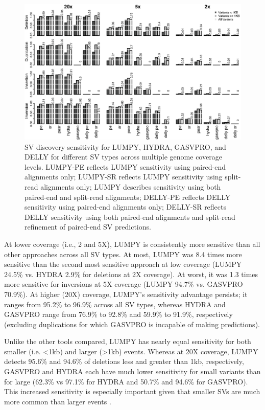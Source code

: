 \documentclass[11pt]{article}
\begin{document}
\begin{figure}
\includegraphics[width=6.5in]{R/ss_sl_s-un_hy_gv_dl-r10x.eps}
\caption{SV discovery sensitivity for LUMPY, HYDRA, GASVPRO, and DELLY for
different SV types across multiple genome coverage levels. LUMPY-PE reflects
LUMPY sensitivity using paired-end alignments only; LUMPY-SR reflects
LUMPY sensitivity using split-read alignments only; LUMPY describes sensitivity
using both paired-end and split-read alignments; DELLY-PE reflects
DELLY sensitivity using paired-end alignments only; DELLY-SR reflects
DELLY sensitivity using both paired-end alignments and split-read refinement
of paired-end SV predictions.}
\label{sensitivity:fig}
\end{figure}

At lower coverage (i.e., 2 and 5X), LUMPY is consistently more sensitive 
than all other approaches across all SV types. At most, LUMPY was 
8.4 times more sensitive than the second most sensitive approach at low 
coverage (LUMPY 24.5\% vs. HYDRA 2.9\% for deletions at 2X coverage). At worst, 
it was 1.3 times more sensitive for inversions at 5X coverage (LUMPY 94.7\% vs. 
GASVPRO 70.9\%). At higher (20X) coverage, 
LUMPY's sensitivity advantage persists; it ranges from 95.2\% to 96.9\% 
across all SV types, whereas HYDRA and GASVPRO range from 76.9\% to 92.8\% and
59.9\% to 91.9\%, respectively (excluding duplications for which GASVPRO is
incapable of making predictions).

Unlike the other tools compared, LUMPY has nearly equal sensitivity for 
both smaller (i.e. \textless 1kb) and larger (\textgreater 1kb) events. 
Whereas at 20X coverage,
LUMPY detects 95.6\% and 94.6\% of deletions less and greater than 1kb, 
respectively, GASVPRO and HYDRA each have much lower sensitivity for small
variants than for large (62.3\% vs 97.1\% for HYDRA and 50.7\% and 94.6\% for
GASVPRO). This increased sensitivity is especially important given that smaller
SVs are much more common than larger events \cite{mills2011}.
\end{document}
